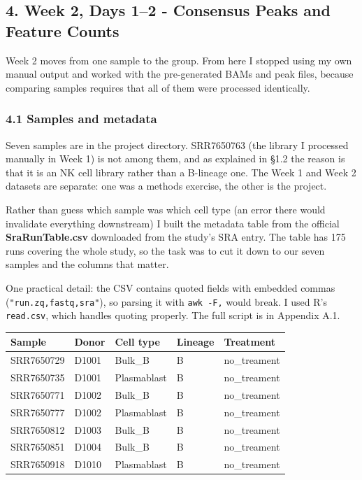 \documentclass[
  11pt,
  a4paper,
]{article}
\begin{document}
\hypertarget{week-2-days-12---consensus-peaks-and-feature-counts}{%
\subsection{4. Week 2, Days 1--2 - Consensus Peaks and Feature
Counts}\label{week-2-days-12---consensus-peaks-and-feature-counts}}

Week 2 moves from one sample to the group. From here I stopped using my
own manual output and worked with the pre-generated BAMs and peak files,
because comparing samples requires that all of them were processed
identically.

\hypertarget{samples-and-metadata}{%
\subsubsection{4.1 Samples and metadata}\label{samples-and-metadata}}

Seven samples are in the project directory. SRR7650763 (the library I
processed manually in Week 1) is not among them, and as explained in
§1.2 the reason is that it is an NK cell library rather than a B-lineage
one. The Week 1 and Week 2 datasets are separate: one was a methods
exercise, the other is the project.

Rather than guess which sample was which cell type (an error there would
invalidate everything downstream) I built the metadata table from the
official \textbf{SraRunTable.csv} downloaded from the study's SRA entry.
The table has 175 runs covering the whole study, so the task was to cut
it down to our seven samples and the columns that matter.

One practical detail: the CSV contains quoted fields with embedded
commas (\texttt{"run.zq,fastq,sra"}), so parsing it with
\texttt{awk\ -F,} would break. I used R's \texttt{read.csv}, which
handles quoting properly. The full script is in Appendix A.1.

\begin{longtable}[]{@{}lllll@{}}
\toprule\noalign{}
Sample & Donor & Cell type & Lineage & Treatment \\
\midrule\noalign{}
\endhead
\bottomrule\noalign{}
\endlastfoot
SRR7650729 & D1001 & Bulk\_B & B & no\_treament \\
SRR7650735 & D1001 & Plasmablast & B & no\_treament \\
SRR7650771 & D1002 & Bulk\_B & B & no\_treament \\
SRR7650777 & D1002 & Plasmablast & B & no\_treament \\
SRR7650812 & D1003 & Bulk\_B & B & no\_treament \\
SRR7650851 & D1004 & Bulk\_B & B & no\_treament \\
SRR7650918 & D1010 & Plasmablast & B & no\_treament \\
\end{longtable}
\end{document}
